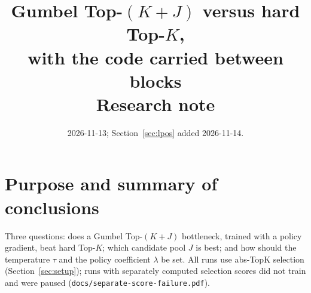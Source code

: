 \documentclass[11pt,a4paper]{article}
\title{Gumbel Top-$(K{+}J)$ versus hard Top-$K$,\\
with the code carried between blocks\\[2pt]
\large Research note}
\author{}
\date{2026-11-13; Section~\ref{sec:lpos} added 2026-11-14.}
\newcommand{\code}[1]{\texttt{#1}}
\begin{document}
\maketitle
\vspace{-2em}

\section{Purpose and summary of conclusions}

Three questions: does a Gumbel Top-$(K{+}J)$ bottleneck, trained with a policy
gradient, beat hard Top-$K$; which candidate pool $J$ is best; and how should the
temperature $\tau$ and the policy coefficient $\lambda$ be set. All runs use
abs-TopK selection (Section~\ref{sec:setup}); runs with separately computed
selection scores did not train and were paused
(\code{docs/separate-score-failure.pdf}).
\end{document}
